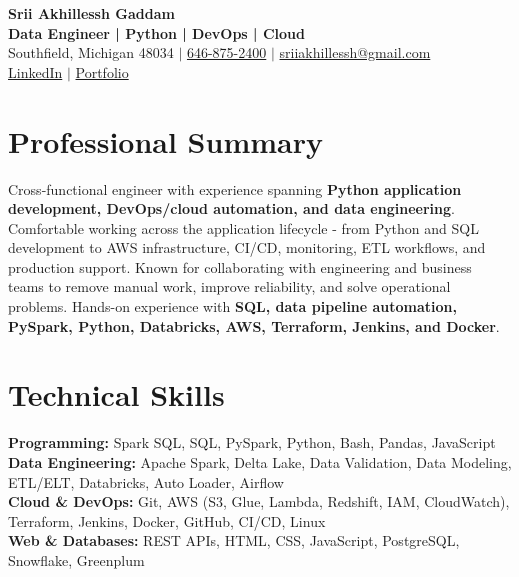 \documentclass[letterpaper,10pt]{article}
\begin{document}
\fontsize{9.35pt}{10.45pt}\selectfont

\begin{center}
    {\LARGE \textbf{Srii Akhillessh Gaddam}} \\[-1pt]
    \textbf{Data Engineer | Python | DevOps | Cloud} \\[2pt]
    Southfield, Michigan 48034 $|$
    \href{tel:6468752400}{646-875-2400} $|$
    \href{mailto:sriiakhillessh@gmail.com}{sriiakhillessh@gmail.com} \\[1pt]
    \href{https://www.linkedin.com/in/srii-akhiilessh-gaddam-b48668191/}{LinkedIn} $|$
    \href{https://sriiakhillesshg.github.io/portfolio/}{Portfolio}
\end{center}
\vspace{-8pt}

\section{Professional Summary}
\small{Cross-functional engineer with experience spanning \textbf{Python application development, DevOps/cloud automation, and data engineering}. Comfortable working across the application lifecycle - from Python and SQL development to AWS infrastructure, CI/CD, monitoring, ETL workflows, and production support. Known for collaborating with engineering and business teams to remove manual work, improve reliability, and solve operational problems. Hands-on experience with \textbf{SQL, data pipeline automation, PySpark, Python, Databricks, AWS, Terraform, Jenkins, and Docker}.}

\section{Technical Skills}
\small{
\textbf{Programming:} Spark SQL, SQL, PySpark, Python, Bash, Pandas, JavaScript \\
\textbf{Data Engineering:} Apache Spark, Delta Lake, Data Validation, Data Modeling, ETL/ELT, Databricks, Auto Loader, Airflow \\
\textbf{Cloud \& DevOps:} Git, AWS (S3, Glue, Lambda, Redshift, IAM, CloudWatch), Terraform, Jenkins, Docker, GitHub, CI/CD, Linux \\
\textbf{Web \& Databases:} REST APIs, HTML, CSS, JavaScript, PostgreSQL, Snowflake, Greenplum
}

\end{document}
